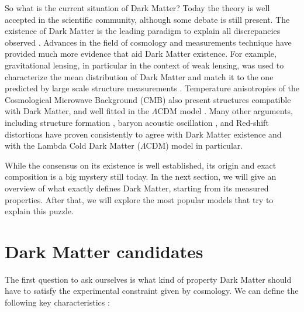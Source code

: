 So what is the current situation of Dark Matter? Today the theory is well accepted in the scientific community, although some debate is still present. The existence of Dark Matter is the leading paradigm to explain all discrepancies observed \cite{hooper}. Advances in the field of cosmology and measurements technique have provided much more evidence that aid Dark Matter existence. For example, gravitational lensing, in particular in the context of weak lensing, was used to characterize the mean distribution of Dark Matter and match it to the one predicted by large scale structure measurements \cite{weak-lensing}. Temperature anisotropies of the Cosmological Microwave Background (CMB) also present structures compatible with Dark Matter, and well fitted in the $\Lambda$CDM model \cite{Ade:2015xua}. Many other arguments, including structure formation \cite{Navarro:1995iw}, baryon acoustic oscillation \cite{bao}, and Red-shift distortions \cite{Peacock2001} have proven consistently to agree with Dark Matter existence and with the Lambda Cold Dark Matter ($\Lambda$CDM) model in particular.

While the consensus on its existence is well established, its origin and exact composition is a big mystery still today. In the next section, we will give an overview of what exactly defines Dark Matter, starting from its measured properties. After that, we will explore the most popular models that try to explain this puzzle.

\section{Dark Matter candidates}
\label{ch1:sec:dm-candidates}

The first question to ask ourselves is what kind of property Dark Matter should have to satisfy the experimental constraint given by cosmology. We can define the following key characteristics \cite{Profumo:2019ujg}:

